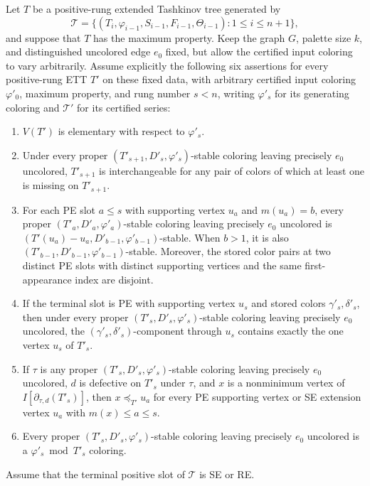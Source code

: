 \begin{helper}
Let \(T\) be a positive-rung extended Tashkinov tree generated by
\[
 \mathcal T=\{(T_i,\varphi_{i-1},S_{i-1},F_{i-1},\Theta_{i-1}):
                   1\leq i\leq n+1\},
\]
and suppose that \(T\) has the maximum property. Keep the graph \(G\),
palette size \(k\), and distinguished uncolored edge \(e_0\) fixed, but
allow the certified input coloring to vary arbitrarily. Assume explicitly
the following six assertions for every positive-rung ETT \(T'\) on these
fixed data, with arbitrary certified input coloring \(\varphi'_0\), maximum
property, and rung number \(s<n\), writing \(\varphi'_s\) for its generating
coloring and \(\mathcal T'\) for its certified series:
\begin{enumerate}
\item \(V(T')\) is elementary with respect to \(\varphi'_s\).
\item Under every proper \((T'_{s+1},D'_s,\varphi'_s)\)-stable coloring
leaving precisely \(e_0\) uncolored, \(T'_{s+1}\) is interchangeable for
any pair of colors of which at least one is missing on \(T'_{s+1}\).
\item For each PE slot \(a\leq s\) with supporting vertex \(u_a\) and
\(m(u_a)=b\), every proper \((T'_a,D'_a,\varphi'_a)\)-stable coloring
leaving precisely \(e_0\) uncolored is
\((T'(u_a)-u_a,D'_{b-1},\varphi'_{b-1})\)-stable. When \(b>1\), it is
also \((T'_{b-1},D'_{b-1},\varphi'_{b-1})\)-stable. Moreover, the stored
color pairs at two distinct PE slots with distinct supporting vertices
and the same first-appearance index are disjoint.
\item If the terminal slot is PE with supporting vertex \(u_s\) and
stored colors \(\gamma'_s,\delta'_s\), then under every proper
\((T'_s,D'_s,\varphi'_s)\)-stable coloring leaving precisely \(e_0\)
uncolored, the \((\gamma'_s,\delta'_s)\)-component through \(u_s\)
contains exactly the one vertex \(u_s\) of \(T'_s\).
\item If \(\tau\) is any proper \((T'_s,D'_s,\varphi'_s)\)-stable
coloring leaving precisely \(e_0\) uncolored, \(d\) is defective on
\(T'_s\) under \(\tau\), and \(x\) is a nonminimum vertex of
\(I[\partial_{\tau,d}(T'_s)]\), then
\(x\preceq_{T'}u_a\) for every PE supporting vertex or SE extension
vertex \(u_a\) with \(m(x)\leq a\leq s\).
\item Every proper \((T'_s,D'_s,\varphi'_s)\)-stable coloring leaving
precisely \(e_0\) uncolored is a \(\varphi'_s\bmod T'_s\) coloring.
\end{enumerate}
Assume that the terminal positive slot of \(\mathcal T\) is SE or RE.


\end{helper}
